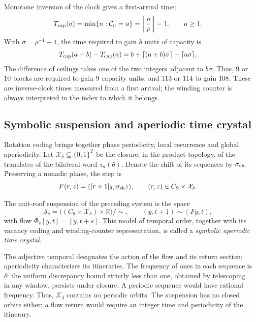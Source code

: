 Monotone inversion of the clock gives a first-arrival time:
\[
 T_{\rm cap}(a)=\min\{n:\mathcal C_n=a\}
 =\left\lceil\frac a\rho\right\rceil-1,
 \qquad a\geq1.
\]
With \(\sigma=\rho^{-1}-1\), the time required to gain \(b\) units
of capacity is
\[
 T_{\rm cap}(a+b)-T_{\rm cap}(a)
 =b+\lceil(a+b)\sigma\rceil-\lceil a\sigma\rceil.
\]
The difference of ceilings takes one of the two integers adjacent to
\(b\sigma\). Thus, \(9\) or \(10\) blocks are required to gain
\(9\) capacity units, and \(113\) or \(114\) to gain \(108\).
These are inverse-clock times measured from a first arrival; the
winding counter is always interpreted in the index to which it belongs.

\subsection{Symbolic suspension and aperiodic time crystal}
\label{mono-ampl:cristal}

Rotation coding brings together phase periodicity, local recurrence
and global aperiodicity. Let \(\mathcal X_\delta\subseteq\{0,1\}^{\mathbb Z}\)
be the closure, in the product topology, of the translates of the
bilateral word \(z_n(\theta)\). Denote the shift of its sequences by
\(\sigma_{\rm sh}\). Preserving a nonadic phase, the step is
\[
 F(r,z)=([r+1]_9,\sigma_{\rm sh}z),\qquad
 (r,z)\in C_9\times\mathcal X_\delta.
\]

\begin{definition}
\label{mono-ampl:def-cristal}
The unit-roof suspension of the preceding system is the space
\[
 \mathcal S_\delta=
 \bigl((C_9\times\mathcal X_\delta)\times\mathbb R\bigr)/\sim,
 \qquad (y,t+1)\sim(Fy,t),
\]
with flow \(\Phi_s[y,t]=[y,t+s]\). This model of temporal order, together with its
vacancy coding and winding-counter representation, is called a
\emph{symbolic aperiodic time crystal}.
\end{definition}

The adjective temporal designates the action of the flow and its return section;
aperiodicity characterizes its itineraries. The frequency of ones in each
sequence is \(\delta\): the uniform discrepancy bound strictly less than one,
obtained by telescoping in any window, persists under closure.
A periodic sequence would have rational frequency. Thus,
\(\mathcal X_\delta\) contains no periodic orbits. The suspension
has no closed orbits either: a flow return would require an integer
time and periodicity of the itinerary.

